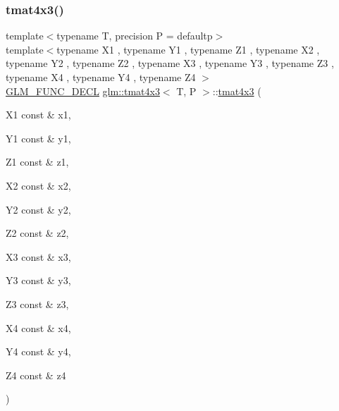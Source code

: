 \subsubsection{\texorpdfstring{tmat4x3()}{tmat4x3()}\hspace{0.1cm}{\footnotesize\ttfamily [8/22]}}
{\footnotesize\ttfamily template$<$typename T, precision P = defaultp$>$ \\
template$<$typename X1 , typename Y1 , typename Z1 , typename X2 , typename Y2 , typename Z2 , typename X3 , typename Y3 , typename Z3 , typename X4 , typename Y4 , typename Z4 $>$ \\
\mbox{\hyperlink{setup_8hpp_ab2d052de21a70539923e9bcbf6e83a51}{G\+L\+M\+\_\+\+F\+U\+N\+C\+\_\+\+D\+E\+CL}} \mbox{\hyperlink{structglm_1_1tmat4x3}{glm\+::tmat4x3}}$<$ T, P $>$\+::\mbox{\hyperlink{structglm_1_1tmat4x3}{tmat4x3}} (\begin{DoxyParamCaption}\item[{X1 const \&}]{x1,  }\item[{Y1 const \&}]{y1,  }\item[{Z1 const \&}]{z1,  }\item[{X2 const \&}]{x2,  }\item[{Y2 const \&}]{y2,  }\item[{Z2 const \&}]{z2,  }\item[{X3 const \&}]{x3,  }\item[{Y3 const \&}]{y3,  }\item[{Z3 const \&}]{z3,  }\item[{X4 const \&}]{x4,  }\item[{Y4 const \&}]{y4,  }\item[{Z4 const \&}]{z4 }\end{DoxyParamCaption})}

\mbox{\label{structglm_1_1tmat4x3_a69caec1d2cb2b9320817a1323211d94d}} 
